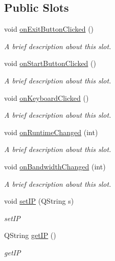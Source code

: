 \subsection*{Public Slots}
\begin{DoxyCompactItemize}
\item 
\hypertarget{class_client_a5f96334ebe2c8a22f6448cff80d027a5}{}\label{class_client_a5f96334ebe2c8a22f6448cff80d027a5} 
void \hyperlink{class_client_a5f96334ebe2c8a22f6448cff80d027a5}{on\+Exit\+Button\+Clicked} ()
\begin{DoxyCompactList}\small\item\em A brief description about this slot. \end{DoxyCompactList}\item 
\hypertarget{class_client_aa56b217ce77d6e41f76474ed92378798}{}\label{class_client_aa56b217ce77d6e41f76474ed92378798} 
void \hyperlink{class_client_aa56b217ce77d6e41f76474ed92378798}{on\+Start\+Button\+Clicked} ()
\begin{DoxyCompactList}\small\item\em A brief description about this slot. \end{DoxyCompactList}\item 
\hypertarget{class_client_a548c8d8b2eb95c3ecbec190495940b99}{}\label{class_client_a548c8d8b2eb95c3ecbec190495940b99} 
void \hyperlink{class_client_a548c8d8b2eb95c3ecbec190495940b99}{on\+Keyboard\+Clicked} ()
\begin{DoxyCompactList}\small\item\em A brief description about this slot. \end{DoxyCompactList}\item 
\hypertarget{class_client_a8dbb1b513ea96c6016e97cb03d4e6b0d}{}\label{class_client_a8dbb1b513ea96c6016e97cb03d4e6b0d} 
void \hyperlink{class_client_a8dbb1b513ea96c6016e97cb03d4e6b0d}{on\+Runtime\+Changed} (int)
\begin{DoxyCompactList}\small\item\em A brief description about this slot. \end{DoxyCompactList}\item 
\hypertarget{class_client_afe033bbce94884369c9b488485f879ad}{}\label{class_client_afe033bbce94884369c9b488485f879ad} 
void \hyperlink{class_client_afe033bbce94884369c9b488485f879ad}{on\+Bandwidth\+Changed} (int)
\begin{DoxyCompactList}\small\item\em A brief description about this slot. \end{DoxyCompactList}\item 
void \hyperlink{class_client_a9699e2db43beff88b4694208c54c1b7f}{set\+IP} (Q\+String s)
\begin{DoxyCompactList}\small\item\em set\+IP \end{DoxyCompactList}\item 
Q\+String \hyperlink{class_client_a91bf1f59731649499365d8b18e6aee62}{get\+IP} ()
\begin{DoxyCompactList}\small\item\em get\+IP \end{DoxyCompactList}\end{DoxyCompactItemize}
